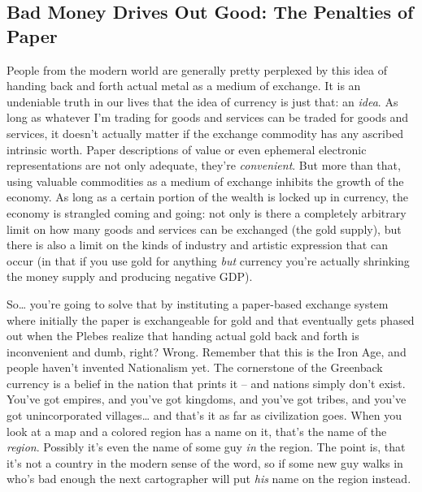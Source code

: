\subsection{Bad Money Drives Out Good: The Penalties of Paper}

People from the modern world are generally pretty perplexed by this idea of handing back and forth actual metal as a medium of exchange. It is an undeniable truth in our lives that the idea of currency is just that: an \textit{idea}. As long as whatever I'm trading for goods and services can be traded for goods and services, it doesn't actually matter if the exchange commodity has any ascribed intrinsic worth. Paper descriptions of value or even ephemeral electronic representations are not only adequate, they're \textit{convenient}. But more than that, using valuable commodities as a medium of exchange inhibits the growth of the economy. As long as a certain portion of the wealth is locked up in currency, the economy is strangled coming and going: not only is there a completely arbitrary limit on how many goods and services can be exchanged (the gold supply), but there is also a limit on the kinds of industry and artistic expression that can occur (in that if you use gold for anything \textit{but} currency you're actually shrinking the money supply and producing negative GDP).

So\ldots{} you're going to solve that by instituting a paper-based exchange system where initially the paper is exchangeable for gold and that eventually gets phased out when the Plebes realize that handing actual gold back and forth is inconvenient and dumb, right? Wrong. Remember that this is the Iron Age, and people haven't invented Nationalism yet. The cornerstone of the Greenback currency is a belief in the nation that prints it -- and nations simply don't exist. You've got empires, and you've got kingdoms, and you've got tribes, and you've got unincorporated villages\ldots{} and that's it as far as civilization goes. When you look at a map and a colored region has a name on it, that's the name of the \textit{region}. Possibly it's even the name of some guy \textit{in} the region. The point is, that it's not a country in the modern sense of the word, so if some new guy walks in who's bad enough the next cartographer will put \textit{his} name on the region instead.

